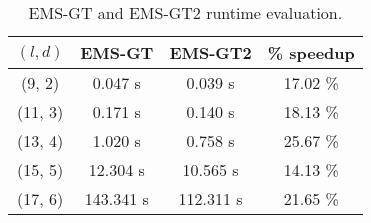 \begin{table}[h] %
	\renewcommand{\arraystretch}{1.3}
	\centering
	\begin{tabular}{|c|c|c|c|}
	\hline 
	\bfseries\boldmath $(l,d)$ & 
	\bfseries EMS-GT & 
	\bfseries\boldmath EMS-GT2  & 
	\bfseries \% speedup\\
	\hline
	(9, 2) & 0.047 s &		0.039 s 	&	17.02 \%\\
	(11, 3) & 0.171 s &		0.140 s 	&	18.13 \%\\
	(13, 4) & 1.020 s &		0.758 s 	&	25.67 \%\\
	(15, 5) & 12.304 s &	10.565 s  	&	14.13 \%\\
	(17, 6) & 143.341 s &	112.311 s 	&	21.65 \%\\
	\hline\end{tabular}
	
	\caption{EMS-GT and EMS-GT2 runtime evaluation.}
	\label{tbl:final-results-ems}
\end{table}
